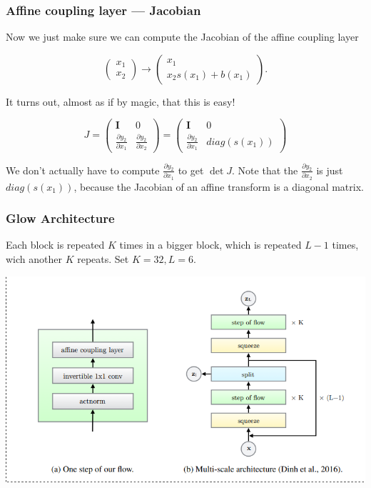 \documentclass{beamer}
\begin{document}
\begin{frame}
  \frametitle{Affine coupling layer --- Jacobian}

  Now we just make sure we can compute the Jacobian of the affine coupling layer

  \[
    \begin{pmatrix} x_1 \\ x_2 \end{pmatrix} \rightarrow
    \begin{pmatrix} x_1 \\ x_2 s(x_1) + b(x_1) \end{pmatrix}.
  \]

  It turns out, almost as if by magic, that this is easy!

  \[
    J = \begin{pmatrix}
      \symbf{I} & 0 \\
      \frac{\partial y_2}{\partial x_1} & \frac{\partial y_2}{\partial x_2}
    \end{pmatrix} = \begin{pmatrix}
      \symbf{I} & 0 \\
      \frac{\partial y_2}{\partial x_1} & diag(s(x_1))
    \end{pmatrix}
  \]

  We don't actually have to compute $\frac{\partial y_2}{\partial x_1}$ to get $\det J$.
  Note that the $\frac{\partial y_2}{\partial x_2}$ is just $diag(s(x_1))$, because the Jacobian
  of an affine transform is a diagonal matrix.

  \href{https://github.com/kmkolasinski/deep-learning-notes/blob/master/seminars/2018-10-Normalizing-Flows-NICE-RealNVP-GLOW/notebooks/flow_layers.py}{}
\end{frame}


\begin{frame}
  \frametitle{Glow Architecture}
  Each block is repeated $K$ times in a bigger block, which is repeated $L-1$
  times, wich another $K$ repeats. Set $K = 32, L = 6$.

  \includegraphics[width=1.0\textwidth]{glow-arch.png}
\end{frame}
\end{document}

